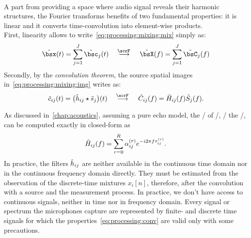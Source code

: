 \\A part from providing a space where audio signal reveals their harmonic structures, the Fourier transforms benefits of two fundamental properties:
it is linear and it converts time-convolution into element-wise products.
\\First, linearity allows to write~\cref{eq:processing:mixing:mix} simply as:
\begin{equation}\label{eq:processing:ft:mix}
    \tilde{\mics}( t) = \sum_{\idxSrc=1}^{\numSrcs} \tilde{\imgs}_\idxSrc( t)
    \mathspace\overset{\fourierTrans{}}{\kto}\mathspace
    \tilde{\MICS}( f) = \sum_{\idxSrc=1}^{\numSrcs} \tilde{\IMGS}_\idxSrc( f)
\end{equation}
Secondly, by the \textit{convolution theorem}, the source spatial images in~\cref{eq:processing:mixing:img} writes as:
\begin{equation}\label{eq:processing:conv}
    \tilde{\img}_{\idxMicSrc}( t) =  \kparen{\tilde{\rir}_{\idxMicSrc} \convCont \tilde{\src}_\idxSrc} ( t)
    \mathspace\overset{\fourierTrans{}}{\kto}\mathspace
    \tilde{\IMG}_{\idxMicSrc}( f) =  \tilde{H}_{\idxMicSrc}( f) \tilde{S}_\idxSrc( f)
    .
\end{equation}

\mynewline
As discussed in~\cref{chap:acoustics}, assuming a pure echo model, the \FT/ of \RIR/, \aka/ the \RTFdef/, can be computed exactly in closed-form as
\begin{equation}\label{eq:processing:rir:ft}
    \tilde{H}_{ij}( f) = \sum_{r=0}^{R} \alpha_{ij}^{(r)} {e}^{- {i} 2 \pi f \tau_{ij}^{(r)}}
    .
\end{equation}
In practice, the filters $\tilde{h}_{ij}$ are neither available in the continuous time domain nor in the continuous frequency domain directly.
They must be estimated from the observation of the discrete-time mixtures $x_i[n]$, therefore, after the convolution with a source and the measurement process.
In practice, we don't have access to continuous signals, neither in time nor in frequency domain.
Every signal or spectrum the microphones capture are represented by finite- and discrete time signals for which the properties~\eqref{eq:processing:conv} are valid only with some precautions.

